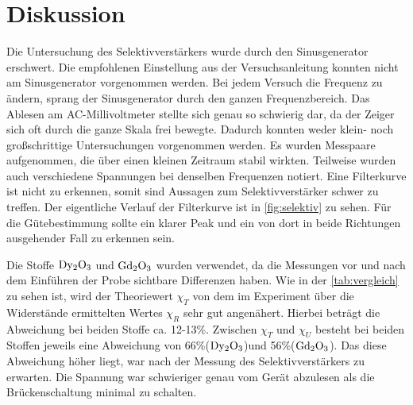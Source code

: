 \section{Diskussion}
\label{sec:Diskussion}

Die Untersuchung des Selektivverstärkers wurde durch den Sinusgenerator erschwert.
Die empfohlenen Einstellung aus der Versuchsanleitung konnten nicht am Sinusgenerator vorgenommen werden.
Bei jedem Versuch die Frequenz zu ändern, sprang der Sinusgenerator durch den ganzen Frequenzbereich.
Das Ablesen am AC-Millivoltmeter stellte sich genau so schwierig dar, da der Zeiger sich oft durch die ganze Skala frei bewegte.
Dadurch konnten weder klein- noch großschrittige Untersuchungen vorgenommen werden.
Es wurden Messpaare aufgenommen, die über einen kleinen Zeitraum stabil wirkten.
Teilweise wurden auch verschiedene Spannungen bei denselben Frequenzen notiert.
Eine Filterkurve ist nicht zu erkennen, somit sind Aussagen zum Selektivverstärker schwer zu treffen.
Der eigentliche Verlauf der Filterkurve ist in \autoref{fig:selektiv} zu sehen. 
Für die Gütebestimmung sollte ein klarer Peak und ein von dort in beide Richtungen ausgehender Fall zu erkennen sein.

Die Stoffe $\ce{Dy2O3}$ und $\ce{Gd2O3}$ wurden verwendet, da die Messungen vor und nach dem Einführen der Probe sichtbare Differenzen haben.
Wie in der \autoref{tab:vergleich} zu sehen ist, wird der Theoriewert $\chi_T$ von dem im Experiment über die Widerstände ermittelten Wertes $\chi_R$ sehr gut angenähert.
Hierbei beträgt die Abweichung bei beiden Stoffe ca. 12-13\%.
Zwischen $\chi_T$ und $\chi_U$ besteht bei beiden Stoffen jeweils eine Abweichung von 66\%($\ce{Dy2O3}$)und 56\%($\ce{Gd2O3}$).
Das diese Abweichung höher liegt, war nach der Ḿessung des Selektivverstärkers zu erwarten.
Die Spannung war schwieriger genau vom Gerät abzulesen als die Brückenschaltung minimal zu schalten.

